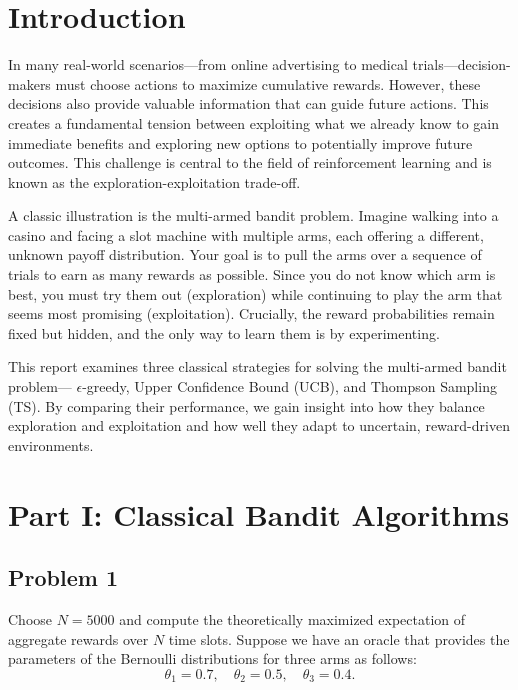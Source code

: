 \documentclass[11pt]{article}
\begin{document}
\newpage

\tableofcontents

\newpage

\newpage
\section{Introduction}

In many real-world scenarios—from online advertising to medical trials—decision-makers must choose actions to maximize cumulative rewards. However, these decisions also provide valuable information that can guide future actions. This creates a fundamental tension between exploiting what we already know to gain immediate benefits and exploring new options to potentially improve future outcomes. This challenge is central to the field of reinforcement learning and is known as the exploration-exploitation trade-off.

A classic illustration is the multi-armed bandit problem. Imagine walking into a casino and facing a slot machine with multiple arms, each offering a different, unknown payoff distribution. Your goal is to pull the arms over a sequence of trials to earn as many rewards as possible. Since you do not know which arm is best, you must try them out (exploration) while continuing to play the arm that seems most promising (exploitation). Crucially, the reward probabilities remain fixed but hidden, and the only way to learn them is by experimenting.

This report examines three classical strategies for solving the multi-armed bandit problem—
$\epsilon$-greedy, Upper Confidence Bound (UCB), and Thompson Sampling (TS). By comparing their performance, we gain insight into how they balance exploration and exploitation and how well they adapt to uncertain, reward-driven environments.

\newpage
\section{Part I: Classical Bandit Algorithms}
\subsection{Problem 1}
Choose $N = 5000$ and compute the theoretically maximized expectation of aggregate rewards over $N$ time slots. Suppose we have an oracle that provides the parameters of the Bernoulli distributions for three arms as follows:
\[
\theta_1 = 0.7, \quad \theta_2 = 0.5, \quad \theta_3 = 0.4.
\]
\end{document}
